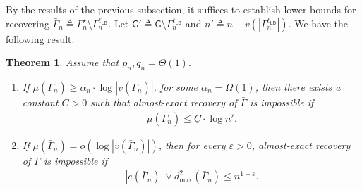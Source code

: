 \documentclass[12pt]{article}
\newtheorem{theorem}{Theorem}
\newcommand{\s}[1]{\mathsf{#1}}
\begin{document}
By the results of the previous subsection, it suffices to establish lower bounds for recovering $\bar{\Gamma}_n \triangleq \Gamma^\star_n \setminus \Gamma_n^{\ell_{\s{LB}}}$. Let $\s{G}'\triangleq\s{G}\setminus\Gamma_n^{\ell_{\s{LB}}}$ and $n'\triangleq n-v(|\Gamma_n^{\ell_{\s{LB}}}|)$. We have the following result.
\begin{theorem}\label{thm:lowerp2weak}
Assume that $p_n,q_n=\Theta(1)$. %
\begin{enumerate}
\item If $\mu(\bar\Gamma_n)\geq \alpha_n\cdot \log|v(\bar\Gamma_n)|$, for some $\alpha_n=\Omega(1)$, then there exists a constant $\underline{C}>0$ such that almost-exact recovery of $\bar\Gamma$ is impossible if
    \begin{align}
        \mu(\bar\Gamma_n)\leq \underline{C}\cdot \log n'.\label{eq:condDenseStatweakApp}
    \end{align}
\item If $\mu(\bar\Gamma_n)=o(\log|v(\bar\Gamma_n)|)$, then for every $\varepsilon>0$, almost-exact recovery of $\bar\Gamma$ is impossible if
    \begin{align}
        |e(\bar\Gamma_n)|\vee d^2_{\max}(\bar\Gamma_n)\leq n^{1-\varepsilon}.\label{condDenseStat2weakApp}
    \end{align}
\end{enumerate}
\end{theorem}
\end{document}
